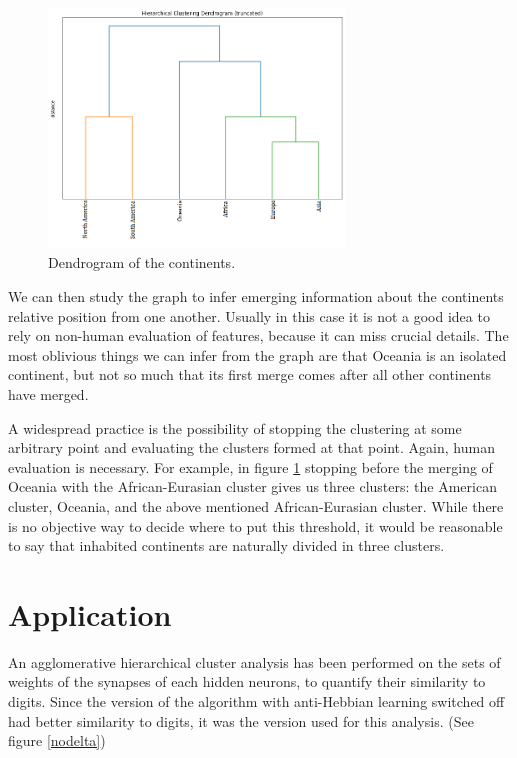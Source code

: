 \documentclass[a4paper]{report}
\begin{document}

\begin{figure} [H]
\centering
\includegraphics [width=0.7\textwidth] {o/continents.png}
\caption{Dendrogram of the continents.}
\label{conte}
\end{figure}

We can then study the graph to infer emerging information about the continents relative position from one another.
Usually in this case it is not a good idea to rely on non-human evaluation of features, because it can miss crucial details.
The most oblivious things we can infer from the graph are that Oceania is an isolated continent, but not so much that its first merge comes after all other continents have merged.

A widespread practice is the possibility of stopping the clustering at some arbitrary point and evaluating the clusters formed at that point.
Again, human evaluation is necessary.
For example, in figure \ref{conte} stopping before the merging of Oceania with the African-Eurasian cluster gives us three clusters:
the American cluster, Oceania, and the above mentioned African-Eurasian cluster.
While there is no objective way to decide where to put this threshold, it would be reasonable to say that inhabited continents are naturally divided in three clusters.

\section{Application}

An agglomerative hierarchical cluster analysis has been performed on the sets of weights of the synapses of each hidden neurons, to quantify their similarity to digits.
Since the version of the algorithm with anti-Hebbian learning switched off had better similarity to digits, it was the version used for this analysis.
(See figure \ref{nodelta})
\end{document}
